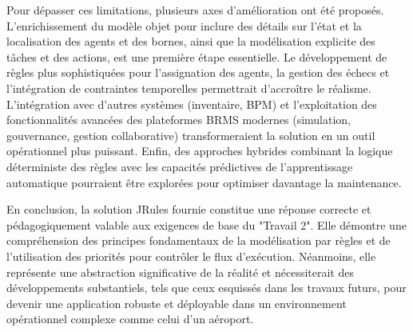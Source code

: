 \documentclass[11pt,a4paper]{article}
\begin{document}
Pour dépasser ces limitations, plusieurs axes d'amélioration ont été proposés. L'enrichissement du modèle objet pour inclure des détails sur l'état et la localisation des agents et des bornes, ainsi que la modélisation explicite des tâches et des actions, est une première étape essentielle. Le développement de règles plus sophistiquées pour l'assignation des agents, la gestion des échecs et l'intégration de contraintes temporelles permettrait d'accroître le réalisme. L'intégration avec d'autres systèmes (inventaire, BPM) et l'exploitation des fonctionnalités avancées des plateformes BRMS modernes (simulation, gouvernance, gestion collaborative) transformeraient la solution en un outil opérationnel plus puissant. Enfin, des approches hybrides combinant la logique déterministe des règles avec les capacités prédictives de l'apprentissage automatique pourraient être explorées pour optimiser davantage la maintenance.

En conclusion, la solution JRules fournie constitue une réponse correcte et pédagogiquement valable aux exigences de base du "Travail 2". Elle démontre une compréhension des principes fondamentaux de la modélisation par règles et de l'utilisation des priorités pour contrôler le flux d'exécution. Néanmoins, elle représente une abstraction significative de la réalité et nécessiterait des développements substantiels, tels que ceux esquissés dans les travaux futurs, pour devenir une application robuste et déployable dans un environnement opérationnel complexe comme celui d'un aéroport.
\clearpage
\nocite{*}


\tableofcontents
\clearpage
\tiny
\end{document}
